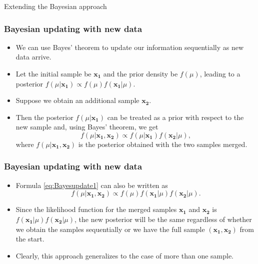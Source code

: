 \documentclass[10pt]{beamer}
\theoremstyle{definition}
\begin{document}
\begin{section}{Extending the Bayesian approach}\label{sec:BayesExt}

\begin{frame}[fragile]
\frametitle{Bayesian updating with new data}
\begin{itemize}\itemsep1em
\item We can use Bayes' theorem to update our information sequentially as new data arrive.
\item Let the initial sample be $\mathbf{x_1}$ and the prior density be $f(\mu)$, leading to a posterior $f(\mu|\mathbf{x_1}) \propto
f(\mu)f(\mathbf{x_1}|\mu)$.
\item Suppose we obtain an additional sample $\mathbf{x_2}$.
\item Then the posterior $f(\mu|\mathbf{x_1})$ can be treated as a prior with respect to the new sample and, using Bayes' theorem, we get
\begin{equation}
\label{eq:Bayesupdate1} f(\mu|\mathbf{x_1},\mathbf{x_2}) \propto
f(\mu|\mathbf{x_1})f(\mathbf{x_2}|\mu),
\end{equation} 
where $f(\mu|\mathbf{x_1},\mathbf{x_2})$ is the posterior obtained with the two samples merged.
\end{itemize}
\end{frame}

\begin{frame}[fragile]
\frametitle{Bayesian updating with new data}
\begin{itemize}\itemsep1em
\item Formula \eqref{eq:Bayesupdate1} can also be written as 
\begin{equation}
\label{eq:Bayesupdate2} f(\mu|\mathbf{x_1},\mathbf{x_2}) \propto
f(\mu)f(\mathbf{x_1}|\mu)f(\mathbf{x_2}|\mu).
\end{equation}
\item Since the likelihood function for the merged samples $\mathbf{x_1}$ and $\mathbf{x_2}$ is $f(\mathbf{x_1}|\mu)f(\mathbf{x_2}|\mu)$, the new posterior will be the same regardless of whether we obtain the samples sequentially or we have the full sample $(\mathbf{x_1},\mathbf{x_2})$ from the start.
\item Clearly, this approach generalizes to the case of more than one sample.
\end{itemize}
\end{frame}


\end{section}
\end{document}
